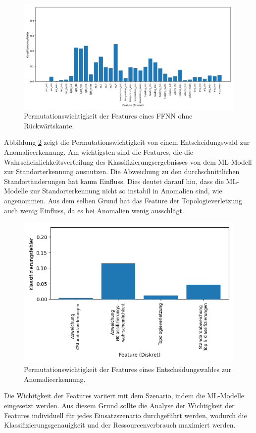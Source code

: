 \begin{figure}[h!]
    \centering
    \includegraphics[width=\linewidth]{images/fi_wo_fe_knn.png}
    \caption{Permutationswichtigkeit der Features eines FFNN ohne Rückwärtskante.}
    \label{fig:feature_significance_knn_wo_fe}
\end{figure}
\newline
\newline
Abbildung \ref{fig:feature_significance_dt_anomaly} zeigt die Permutationswichtigkeit von einem Entscheidungswald zur Anomalieerkennung.
Am wichtigsten sind die Features, die die Wahrscheinlichkeitsverteilung des Klassifizierungsergebnisses von dem ML-Modell zur Standorterkennung ausnutzen.
Die Abweichung zu den durchschnittlichen Standortänderungen hat kaum Einfluss.
Dies deutet darauf hin, dass die ML-Modelle zur Standorterkennung nicht so instabil in Anomalien sind, wie angenommen.
Aus dem selben Grund hat das Feature der Topologieverletzung auch wenig Einfluss, da es bei Anomalien wenig ausschlägt.
\begin{figure}[h!]
    \centering
    \includegraphics[width=0.65\linewidth]{images/fi_anomaly_dt.png}
    \caption{Permutationswichtigkeit der Features eines Entscheidungswaldes zur Anomalieerkennung.}
    \label{fig:feature_significance_dt_anomaly}
\end{figure}
\newline
\newline
Die Wichitgkeit der Features variiert mit dem Szenario, indem die ML-Modelle eingesetzt werden.
Aus diesem Grund sollte die Analyse der Wichtigkeit der Features individuell für jedes Einsatzszenario durchgeführt werden,
wodurch die Klassifizierungsgenauigkeit und der Ressourcenverbrauch maximiert werden.